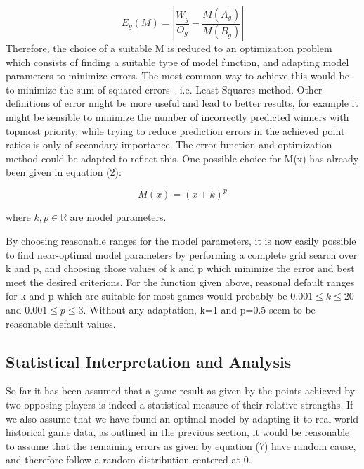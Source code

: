 \documentclass[a4paper]{article}
\begin{document}
\begin{equation}
E_g(M) = \left\vert \frac{W_g}{ O_g } - \frac{M(A_{g})}{M(B_{g})} \right\vert  
\end{equation}
\newline\newline
Therefore, the choice of a suitable M is reduced to an optimization problem which consists of finding 
a suitable type of model function, and adapting model parameters to minimize errors. The most common way
to achieve this would be to minimize the sum of squared errors - i.e. Least Squares method. 
\newline\newline
Other definitions of error might be more useful and lead to better results, for example it might be sensible to minimize the number of incorrectly
predicted winners with topmost priority, while trying to reduce prediction errors in the achieved point ratios is only of secondary
importance. The error function and optimization method could be adapted to reflect this.  
\newline\newline
One possible choice for M(x) has already been given in equation (2):

$$
M(x) = ( x + k)^p
$$

where $ k,p \in \mathbb{R} $ are model parameters. 
\newline\newline

By choosing reasonable ranges for the model parameters, it is now easily possible to find near-optimal model parameters by performing a complete
grid search over k and p, and choosing those values of k and p which minimize the error and best meet the desired criterions.
\newline\newline
For the function given above, reasonal default ranges for k and p which are suitable for most games would probably be 
$ 0.001 \leq k \leq 20 $ and $ 0.001 \leq  p \leq 3 $.
\newline\newline
Without any adaptation, k=1 and p=0.5 seem to be reasonable default values.

\subsection*{Statistical Interpretation and Analysis}

So far it has been assumed that a game result as given by the points achieved by two opposing players is indeed a statistical measure of their
relative strengths. If we also assume that we have found an optimal model by adapting it to real world historical game data, as outlined
in the previous section, it would be reasonable to assume that the remaining errors as given by equation (7) have random cause, and therefore
follow a random distribution centered at 0.
\end{document}
